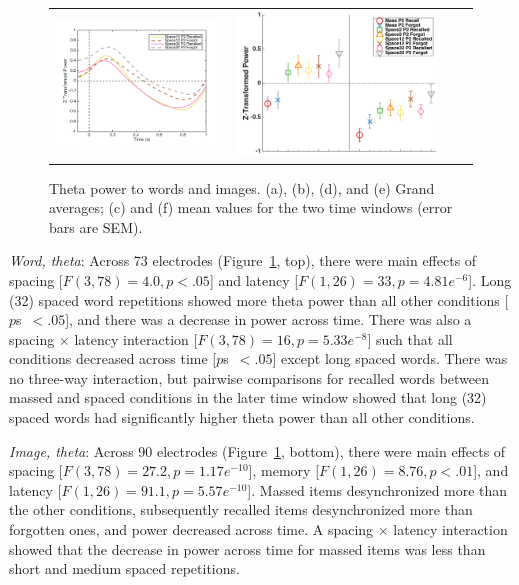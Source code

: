 \begin{figure}[H]
\begin{tabular}{cccc}
  \includegraphics[width=.30\textwidth]{./figs/exp2/tfr_line/tfr_line_ga_img_rc_spac12_p2_img_fo_spac12_p2_img_rc_spac32_p2_img_fo_spac32_p2_4_8_-100_1000_90ROIs_legend} &
  \includegraphics[width=.30\textwidth]{./figs/exp2/tfr_avg/tfr_avg_ga_img_rc_mass_p2_img_fo_mass_p2_img_rc_spac2_p2_img_fo_spac2_p2_img_rc_spac12_p2_img_fo_spac12_p2_img_rc_spac32_p2_img_fo_spac32_p2_4_8_0_500_500_1000_90ROI_ylabel} \\
  \end{tabular}
  \caption{Theta power to words and images.  (a), (b), (d), and (e) Grand averages; (c) and (f) mean values for the two time windows (error bars are SEM).}
  \label{fig:s2_word_img_theta}
\end{figure}

\textit{Word, theta}: Across 73 electrodes (Figure~\ref{fig:s2_word_img_theta}, top), there were main effects of spacing [$F(3,78)=4.0, p<.05$] and latency [$F(1,26)=33, p=4.81e^{-6}$].  Long (32) spaced word repetitions showed more theta power than all other conditions [$p$s~$<.05$], and there was a decrease in power across time.  There was also a spacing $\times$ latency interaction [$F(3,78)=16, p=5.33e^{-8}$] such that all conditions decreased across time [$p$s~$<.05$] except long spaced words.
There was no three-way interaction, but pairwise comparisons for recalled words between massed and spaced conditions in the later time window showed that long (32) spaced words had significantly higher theta power than all other conditions.

\textit{Image, theta}: Across 90 electrodes (Figure~\ref{fig:s2_word_img_theta}, bottom), there were main effects of spacing [$F(3,78)=27.2, p=1.17e^{-10}$], memory [$F(1,26)=8.76, p<.01$], and latency [$F(1,26)=91.1, p=5.57e^{-10}$].  Massed items desynchronized more than the other conditions, subsequently recalled items desynchronized more than forgotten ones, and power decreased across time.  A spacing $\times$ latency interaction showed that the decrease in power across time for massed items was less than short and medium spaced repetitions.

